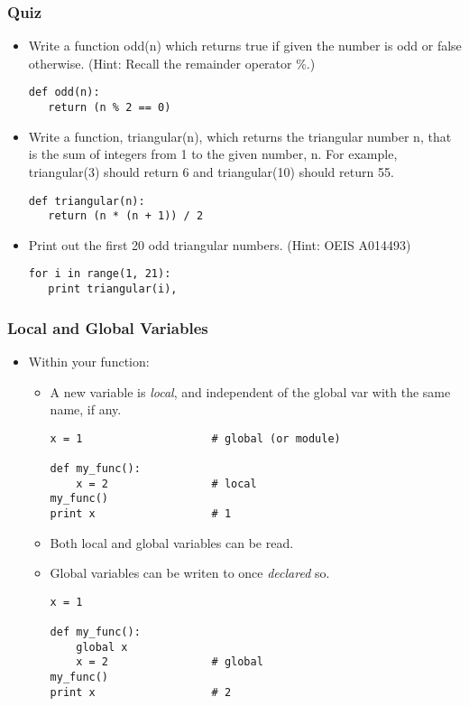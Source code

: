 \documentclass{beamer}
\begin{document}
\begin{frame}[fragile]
\frametitle{Quiz}
\begin{itemize}
\item Write a function odd(n) which returns true if given the
    number is odd or false otherwise. (Hint: Recall the remainder
    operator \%.)
\begin{lstlisting}[escapechar=\%]
def odd(n):
   return (n % 2 == 0)
\end{lstlisting}
\item Write a function, triangular(n), which returns the 
    triangular number n, that is the sum of integers from
    1 to the given number, n. For example, triangular(3)
    should return 6 and triangular(10) should return 55.
\begin{lstlisting}[escapechar=\%]
def triangular(n):
   return (n * (n + 1)) / 2
\end{lstlisting}
\item Print out the first 20 odd triangular numbers.
    (Hint: OEIS A014493)
\begin{lstlisting}[escapechar=\%]
for i in range(1, 21):
   print triangular(i),
\end{lstlisting}
\end{itemize}
\end{frame}

\begin{frame}[fragile]
\frametitle{Local and Global Variables}
\begin{itemize}
\item Within your function:
\begin{itemize}
\item A new variable 
      is \emph{local}, and independent of the global
      var with the same name, if any.
\begin{lstlisting}
x = 1                    # global (or module)

def my_func():
    x = 2                # local 
my_func()                
print x                  # 1
\end{lstlisting}
\item Both local and global variables can be read.
\item Global variables can be writen to once \emph{declared} so.
\begin{lstlisting}
x = 1                    

def my_func():
    global x
    x = 2                # global 
my_func()                
print x                  # 2
\end{lstlisting}
\end{itemize}
\end{itemize}
\end{frame}
\end{document}
